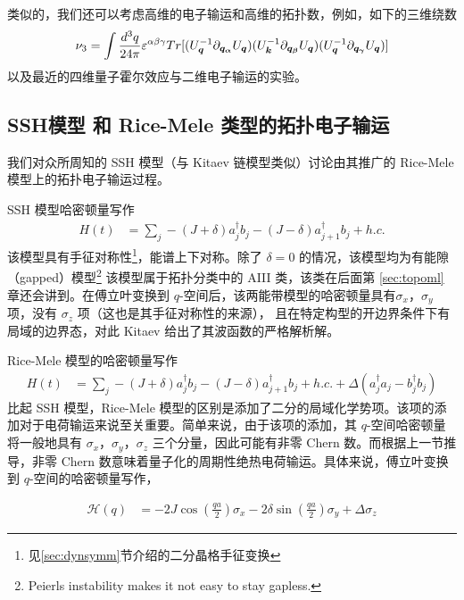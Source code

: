 类似的，我们还可以考虑高维的电子输运和高维的拓扑数，例如，如下的三维绕数
\begin{align}
\nu_3=\int\dfrac{d^3q}{24\pi}\varepsilon^{\alpha\beta\gamma}Tr[(U_{\boldsymbol{q}}^{-1}\partial_{\boldsymbol{q_{\alpha}}}U_{\boldsymbol{q}})(U_{\boldsymbol{k}}^{-1}\partial_{\boldsymbol{q_{\beta}}}U_{\boldsymbol{q}})(U_{\boldsymbol{q}}^{-1}\partial_{\boldsymbol{q_{\gamma}}}U_{\boldsymbol{q}})]
\end{align}
以及最近的四维量子霍尔效应与二维电子输运的实验\cite{4dqhall-expr-2018}。


\subsection{SSH模型 和 Rice-Mele 类型的拓扑电子输运}\label{sec:ssh}

我们对众所周知的 SSH 模型\cite{ssh1979}（与 Kitaev 链模型\cite{kitaev2001}类似）讨论由其推广的 Rice-Mele 模型上的拓扑电子输运过程。

SSH 模型哈密顿量写作
\begin{align}
H(t) &=\sum_j-(J+\delta)a_j^{\dagger}b_j-(J-\delta)a_{j+1}^{\dagger}b_j+h.c.
\end{align}
该模型具有手征对称性\footnote{见\ref{sec:dynsymm}节介绍的二分晶格手征变换}，能谱上下对称。除了 $\delta=0$ 的情况，该模型均为有能隙（gapped）模型\footnote{Peierls instability makes it not easy to stay gapless.}
该模型属于拓扑分类\cite{topoclassify2016}中的 AIII 类，该类在后面第 \ref{sec:topoml} 章还会讲到。在傅立叶变换到 $q$-空间后，该两能带模型的哈密顿量具有$\sigma_x$，$\sigma_y$ 项，没有 $\sigma_z$ 项（这也是其手征对称性的来源）， 且在特定构型的开边界条件下有局域的边界态，对此 Kitaev 给出了其波函数的严格解析解\cite{kitaev2001}。

Rice-Mele 模型的哈密顿量写作
\begin{align}
H(t) &=\sum_j-(J+\delta)a_j^{\dagger}b_j-(J-\delta)a_{j+1}^{\dagger}b_j+h.c.+\Delta(a_j^{\dagger}a_j-b_j^{\dagger}b_j)
\end{align}
比起 SSH 模型，Rice-Mele 模型的区别是添加了二分的局域化学势项。该项的添加对于电荷输运来说至关重要。简单来说，由于该项的添加，其 $q$-空间哈密顿量将一般地具有 $\sigma_x$，$\sigma_y$，$\sigma_z$ 三个分量，因此可能有非零 Chern 数。而根据上一节推导，非零 Chern 数意味着量子化的周期性绝热电荷输运。具体来说，傅立叶变换到 $q$-空间的哈密顿量写作，

\begin{align}
\mathcal{H}(q)
&=-2J\cos(\frac{qa}{2})\sigma_x-2\delta\sin(\frac{qa}{2})\sigma_y+\Delta\sigma_z
\end{align}

